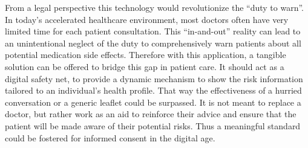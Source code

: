 From a legal perspective this technology would revolutionize the “duty to warn”. In today's accelerated healthcare environment, most doctors often have very limited time for each patient consultation. This “in-and-out” reality can lead to an unintentional neglect of the duty to comprehensively warn patients about all potential medication side effects. Therefore with this application, a tangible solution can be offered to bridge this gap in patient care. It should act as a digital safety net, to provide a dynamic mechanism to show the risk information tailored to an individual's health profile. That way the effectiveness of a hurried conversation or a generic leaflet could be surpassed. It is not meant to replace a doctor, but rather work as an aid to reinforce their advice and ensure that the patient will be made aware of their potential risks.
Thus a meaningful standard could be fostered for informed consent in the digital age.
